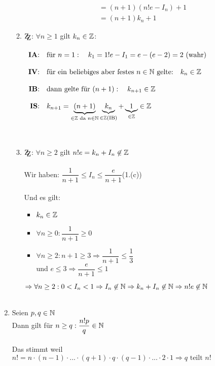 \begin{Beweis}
\begin{enumerate}
\begin{enumerate}
\begin{align*}
&=(n+1)(n!e-I_n)+1\\
&=(n+1)k_n+1
\end{align*}
\item $\zz$: $\forall n\geq1$ gilt $k_n\in\mathbb{Z}$:\\\\
$\begin{array}{rl}
\mbox{\textbf{IA}:} & \mbox{für }n=1:\quad k_1=1!e-I_1=e-(e-2)=2 \mbox{ (wahr)} \\\\
\mbox{\textbf{IV}:} & \mbox{für ein beliebiges aber festes }n\in\mathbb{N} \mbox{ gelte:}\quad k_n\in\mathbb{Z}\\\\
\mbox{\textbf{IB}:} & \mbox{dann gelte für }(n+1):\quad k_{n+1}\in\mathbb{Z}\\\\
\mbox{\textbf{IS}:} & k_{n+1}=\underbrace{(n+1)}_{\in\mathbb{Z}\text{ da }n\in\mathbb{N}}\underbrace{k_n}_{\in\mathbb{Z}\text{(IB)}}+\underbrace{1}_{\in\mathbb{Z}}\in\mathbb{Z}\\\\
\end{array}$
\\\\
\item $\zz$: $\forall n\geq 2$ gilt $n!e=k_n+I_n\not\in\mathbb{Z}$\\\\
Wir haben: $\dfrac{1}{n+1}\leq I_n \leq  \dfrac{e}{n+1}$\quad(1.(c))\\\\
Und es gilt: \begin{itemize}\item$k_n\in\mathbb{Z}$
				\item $\forall n\geq0:\dfrac{1}{n+1}\geq 0$
				\item $\forall n\geq2:n+1\geq3\Rightarrow \dfrac{1}{n+1}\leq \dfrac{1}{3}$\\
					und $e\leq3 \Rightarrow \dfrac{e}{n+1}\leq 1$\\
		\end{itemize}
$\Rightarrow\forall n\geq2:0<I_n<1\Rightarrow I_n\not\in\mathbb{N}\Rightarrow k_n+I_n\not\in\mathbb{N}\Rightarrow n!e\not\in\mathbb{N}$\\\\\end{enumerate}
\item Seien $p, q \in\mathbb{N}$\\
Dann gilt für $n\geq q:\dfrac{n!p}{q}\in\mathbb{N}$\\\\
Das stimmt weil $n!=n\cdot(n-1)\cdot...\cdot(q+1)\cdot q\cdot(q-1)\cdot...\cdot2\cdot1\Rightarrow q \text{ teilt }n!$

\end{enumerate}
\end{Beweis}
